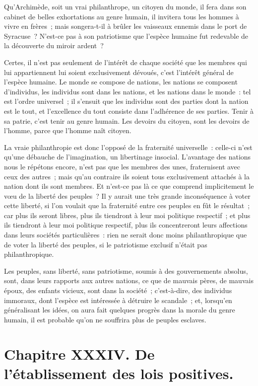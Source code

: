 \documentclass[french,twoside]{book} %
\newcommand\chapteropen{} %
\newcommand\chapterclose{} %
\begin{document}
Qu’Archimède, soit un vrai philanthrope, un citoyen du monde, il fera dans son cabinet de belles exhortations au genre humain, il invitera tous les hommes à vivre en frères ; mais songera-t-il à brûler les vaisseaux ennemis dans le port de Syracuse ? N’est-ce pas à son patriotisme que l’espèce humaine fut redevable de la découverte du miroir ardent ?\par
Certes, il n’est pas seulement de l’intérêt de chaque société que les membres qui lui appartiennent lui soient exclusivement dévoués, c’est l’intérêt général de l’espèce humaine. Le monde se compose de nations, les nations se composent d’individus, les individus sont dans les nations, et les nations dans le monde : tel est l’ordre universel ; il s’ensuit que les individus sont des parties dont la nation est le tout, et l’excellence du tout consiste dans l’adhérence de ses parties. Tenir à sa patrie, c’est tenir au genre humain. Les devoirs du citoyen, sont les devoirs de l’homme, parce que l’homme naît citoyen.\par
La vraie philanthropie est donc l’opposé de la fraternité universelle : celle-ci n’est qu’une débauche de l’imagination, un libertinage insocial. L’avantage des nations nous le répétons encore, n’est pas que les membres des unes, fraternisent avec ceux des autres ; mais qu’au contraire ils soient tous exclusivement attachés à la nation dont ils sont membres. Et n’est-ce pas là ce que comprend implicitement le vœu de la liberté des peuples ? Il y aurait une très grande inconséquence à voter cette liberté, si l’on voulait que la fraternité entre ces peuples en fût le résultat ; car plus ils seront libres, plus ils tiendront à leur moi politique respectif ; et plus ils tiendront à leur moi politique respectif, plus ils concentreront leurs affections dans leurs sociétés particulières : rien ne serait donc moins philanthropique que de voter la liberté des peuples, si le patriotisme exclusif n’était pas philanthropique.\par
Les peuples, sans liberté, sans patriotisme, soumis à des gouvernements absolus, sont, dans leurs rapports aux autres nations, ce que de mauvais pères, de mauvais époux, des enfants vicieux, sont dans la société ; c’est-à-dire, des individus immoraux, dont l’espèce est intéressée à détruire le scandale ; et, lorsqu’en généralisant les idées, on aura fait quelques progrès dans la morale du genre humain, il est probable qu’on ne souffrira plus de peuples esclaves.
\chapterclose


\chapteropen
\chapter[{Chapitre XXXIV. De l’établissement des lois positives.}]{Chapitre XXXIV. De l’établissement des lois positives.}\renewcommand{\leftmark}{Chapitre XXXIV. De l’établissement des lois positives.}
\end{document}
